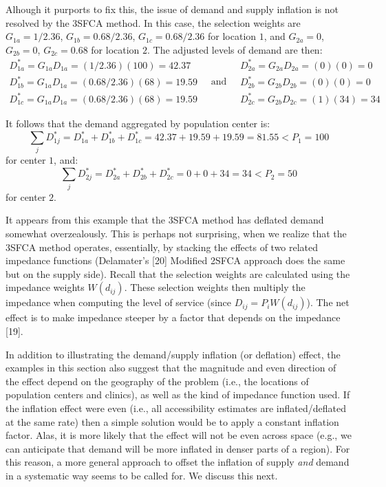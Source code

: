 \documentclass[10pt,letterpaper]{article}
\begin{document}
Alhough it purports to fix this, the issue of demand and supply
inflation is not resolved by the 3SFCA method. In this case, the
selection weights are \(G_{1a} = 1/2.36\), \(G_{1b} = 0.68/2.36\),
\(G_{1c} = 0.68/2.36\) for location \(1\), and \(G_{2a} = 0\),
\(G_{2b} = 0\), \(G_{2c} = 0.68\) for location \(2\). The adjusted
levels of demand are then: \[
\begin{array}{l}
            D^*_{1a} = G_{1a}D_{1a} = (1/2.36)(100) = 42.37 \\
            D^*_{1b} = G_{1a}D_{1a} = (0.68/2.36)(68) = 19.59 \\
            D^*_{1c} = G_{1a}D_{1a} = (0.68/2.36)(68) = 19.59
\end{array}\quad \text{and}\quad
\begin{array}{ll}
            D^*_{2a} = G_{2a}D_{2a} = (0)(0) = 0 \\
            D^*_{2b} = G_{2b}D_{2b} = (0)(0) = 0 \\
            D^*_{2c} = G_{2b}D_{2c} = (1)(34) = 34
\end{array}
\]

It follows that the demand aggregated by population center is: \[
\sum_jD^*_{1j} = D^*_{1a} + D^*_{1b} + D^*_{1c} = 42.37 + 19.59 + 19.59 = 81.55 < P_1 = 100
\] for center \(1\), and: \[
\sum_jD^*_{2j} = D^*_{2a} + D^*_{2b} + D^*_{2c} = 0 + 0 + 34 = 34 < P_2 = 50
\] for center \(2\).

It appears from this example that the 3SFCA method has deflated demand
somewhat overzealously. This is perhaps not surprising, when we realize
that the 3SFCA method operates, essentially, by stacking the effects of
two related impedance functions (Delamater's {[}20{]} Modified 2SFCA
approach does the same but on the supply side). Recall that the
selection weights are calculated using the impedance weights
\(W(d_{ij})\). These selection weights then multiply the impedance when
computing the level of service (since \(D_{ij} = P_iW(d_{ij})\)). The
net effect is to make impedance steeper by a factor that depends on the
impedance {[}19{]}.

In addition to illustrating the demand/supply inflation (or deflation)
effect, the examples in this section also suggest that the magnitude and
even direction of the effect depend on the geography of the problem
(i.e., the locations of population centers and clinics), as well as the
kind of impedance function used. If the inflation effect were even
(i.e., all accessibility estimates are inflated/deflated at the same
rate) then a simple solution would be to apply a constant inflation
factor. Alas, it is more likely that the effect will not be even across
space (e.g., we can anticipate that demand will be more inflated in
denser parts of a region). For this reason, a more general approach to
offset the inflation of supply \emph{and} demand in a systematic way
seems to be called for. We discuss this next.
\end{document}

